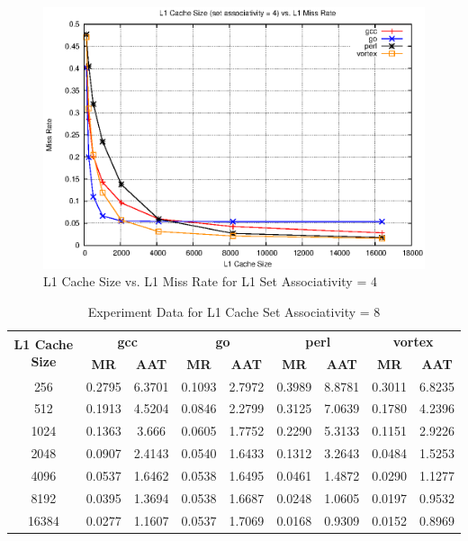 \documentclass[a4paper]{article}
\begin{document}
\begin{figure}
    \centering
    \includegraphics[scale=1.32] {l1_sa_4.eps}
    \captionsetup{justification=centering}
    \caption{L1 Cache Size vs. L1 Miss Rate for L1 Set Associativity = 4}
    \label{fig:l1mr_graph_sa4}
\end{figure}

\begin{table}[htbp]
    \centering
    \begin{tabular}{|c|c|c|c|c|c|c|c|c|}
        \hline
        \multirow{2}[4]{*}{\bf L1 Cache Size} & \multicolumn{2}{c|}{\bf gcc} & \multicolumn{2}{c|}{\bf go} & \multicolumn{2}{c|}{\bf perl}          &\multicolumn{2}{c|}{\bf vortex}\\
        \cline{2-9} & \bf MR & \bf AAT & \bf MR & \bf AAT & \bf MR & \bf AAT & \bf MR & \bf AAT \\
        \hline
        256 & 0.2795 & 6.3701 & 0.1093 & 2.7972 & 0.3989 & 8.8781 & 0.3011 & 6.8235 \\
        512 & 0.1913 & 4.5204 & 0.0846 & 2.2799 & 0.3125 & 7.0639 & 0.1780 & 4.2396 \\
        1024 & 0.1363 & 3.666 & 0.0605 & 1.7752 & 0.2290 & 5.3133 & 0.1151 & 2.9226 \\
        2048 & 0.0907 & 2.4143 & 0.0540 & 1.6433 & 0.1312 & 3.2643 & 0.0484 & 1.5253 \\
        4096 & 0.0537 & 1.6462 & 0.0538 & 1.6495 & 0.0461 & 1.4872 & 0.0290 & 1.1277 \\
        8192 & 0.0395 & 1.3694 & 0.0538 & 1.6687 & 0.0248 & 1.0605 & 0.0197 & 0.9532 \\
        16384 & 0.0277 & 1.1607 & 0.0537 & 1.7069 & 0.0168 & 0.9309 & 0.0152 & 0.8969 \\
        \hline
    \end{tabular}
    \captionsetup{justification=centering}
    \caption{Experiment Data for L1 Cache Set Associativity = 8}
    \label{tab:l1mr_data_sa8}
\end{table}
\end{document}
